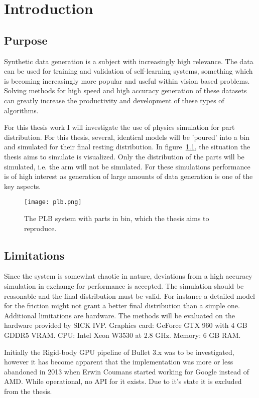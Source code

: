 \chapter{Introduction}\label{cha:intro}

\section{Purpose}

Synthetic data generation is a subject with increasingly high relevance.
The data can be used for training and validation of self-learning systems,
something which is becoming increasingly more popular and useful within vision
based problems. Solving methods for high speed and high accuracy generation of these datasets
can greatly increase the productivity and development of these
types of algorithms.

For this thesis work I will investigate the use of physics
simulation for part distribution. For this thesis, several, identical models will
be 'poured' into a bin and simulated for their final resting distribution. In figure~\ref{fig:plb}, the situation
the thesis aims to simulate is visualized. Only the distribution of the parts
will be simulated, i.e. the arm will not be simulated. For these simulations
performance is of high interest as generation of large amounts of data generation
is one of the key aspects.

\begin{figure}[ht]
  \centering
  \texttt{[image: plb.png]}
  \caption{The PLB system with parts in bin, which the thesis aims to reproduce.~\cite{fig:plb}}
  \label{fig:plb}
\end{figure}

\section{Limitations}
Since the system is somewhat chaotic in nature, deviations from a high accuracy
simulation in exchange for performance is accepted. The simulation should be reasonable
and the final distribution must be valid. For instance a detailed
model for the friction might not grant a better final distribution than a simple one.
Additional limitations are hardware. The methods will be evaluated on the hardware
provided by SICK IVP. Graphics card: GeForce GTX 960 with 4 GB GDDR5 VRAM.
CPU: Intel Xeon W3530 at 2.8 GHz.
Memory: 6 GB RAM.

Initially the Rigid-body GPU pipeline of Bullet 3.x was to be investigated, however
it has become apparent that the implementation was more or less abandoned in 2013
when Erwin Coumans started working for Google instead of AMD. While operational,
no API for it exists. Due to it's state it is excluded from the thesis.

